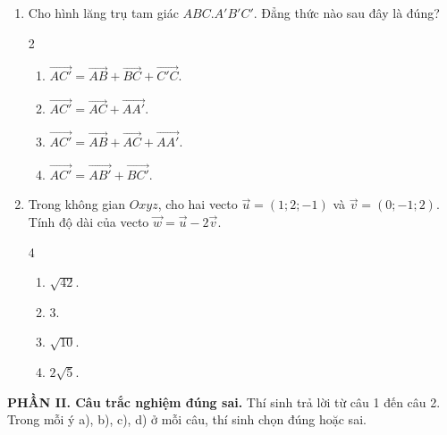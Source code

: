 \documentclass[12pt]{article}
\begin{document}
\begin{enumerate}[label=\textbf{Câu \arabic*.}, leftmargin=*]
		\item Cho hình lăng trụ tam giác $ABC.A'B'C'$. Đẳng thức nào sau đây là đúng?
		\begin{multicols}{2}
			\begin{enumerate}[label=\Alph*.]
				\item $\overrightarrow{AC'} = \overrightarrow{AB} + \overrightarrow{BC} + \overrightarrow{C'C}$.
				\item $\overrightarrow{AC'} = \overrightarrow{AC} + \overrightarrow{AA'}$.
				\item $\overrightarrow{AC'} = \overrightarrow{AB} + \overrightarrow{AC} + \overrightarrow{AA'}$.
				\item $\overrightarrow{AC'} = \overrightarrow{AB'} + \overrightarrow{BC'}$.
			\end{enumerate}
		\end{multicols}
		
		\item Trong không gian $Oxyz$, cho hai vecto $\vec{u} = (1; 2; -1)$ và $\vec{v} = (0; -1; 2)$. Tính độ dài của vecto $\vec{w} = \vec{u} - 2\vec{v}$.
		\begin{multicols}{4}
			\begin{enumerate}[label=\Alph*.]
				\item $\sqrt{42}$.
				\item $3$.
				\item $\sqrt{10}$.
				\item $2\sqrt{5}$.
			\end{enumerate}
		\end{multicols}
		
	\end{enumerate}
	
	\vspace{4mm}
	
	\noindent\textbf{PHẦN II. Câu trắc nghiệm đúng sai.} Thí sinh trả lời từ câu 1 đến câu 2. Trong mỗi ý a), b), c), d) ở mỗi câu, thí sinh chọn đúng hoặc sai.
	\vspace{2mm}
	
\end{document}
